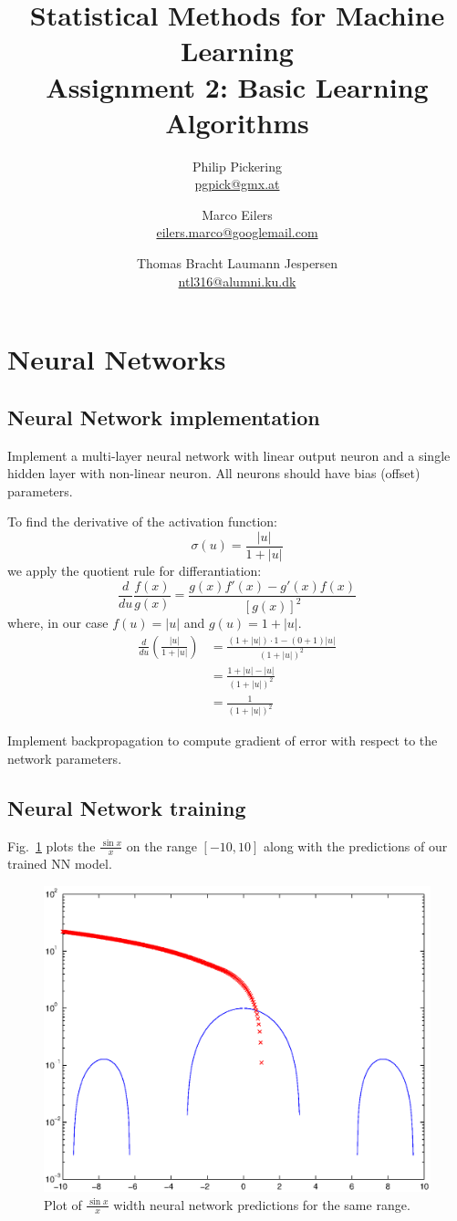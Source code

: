 \documentclass{article}
\author{Philip Pickering\\ \url{pgpick@gmx.at} \and Marco Eilers\\ \url{eilers.marco@googlemail.com} \and Thomas Bracht Laumann Jespersen\\ \url{ntl316@alumni.ku.dk}}
\title{Statistical Methods for Machine Learning\\ Assignment 2: Basic Learning Algorithms}
\date{}
\begin{document}
\maketitle

\section{Neural Networks}

\subsection{Neural Network implementation}

Implement a multi-layer neural network with linear output neuron and a
single hidden layer with non-linear neuron. All neurons should have
bias (offset) parameters.

To find the derivative of the activation function:
\[
\sigma(u) = \frac{|u|}{1 + |u|}
\]
we apply the quotient rule for differantiation:
\[
\frac{d}{du}\frac{f(x)}{g(x)} = \frac{g(x)f'(x) - g'(x)f(x)}{\left[g(x)\right]^2}
\]
where, in our case $f(u) = |u|$ and $g(u) = 1 + |u|$.
\begin{align}
  \frac{d}{du}\left(\frac{|u|}{1 + |u|}\right) &= \frac{(1 + |u|)\cdot 1 - (0 + 1)|u|}{(1 + |u|)^2}\\
  &= \frac{1 + |u| - |u|}{(1 + |u|)^2}\\
  &= \frac{1}{(1 + |u|)^2}
\end{align}

Implement backpropagation to compute gradient of error with respect to
the network parameters.

\subsection{Neural Network training}

Fig.~\ref{fig:semilognn} plots the $\frac{\sin{x}}{x}$ on the range $[-10,10]$ along with the predictions of our trained NN model.

\begin{figure}[!h]
  \centering
  \includegraphics[width=.8\textwidth]{semilognn.eps}
  \caption{Plot of $\frac{\sin{x}}{x}$ width neural network predictions for the same range.}
  \label{fig:semilognn}
\end{figure}
\end{document}
